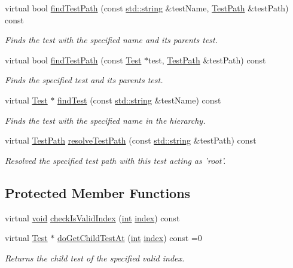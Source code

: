 \begin{DoxyCompactItemize}
virtual bool \hyperlink{class_test_a609b4d93fde2f4fa5b4177c1e1a002ff}{find\-Test\-Path} (const \hyperlink{glew_8h_ae84541b4f3d8e1ea24ec0f466a8c568b}{std\-::string} \&test\-Name, \hyperlink{class_test_path}{Test\-Path} \&test\-Path) const 
\begin{DoxyCompactList}\small\item\em Finds the test with the specified name and its parents test. \end{DoxyCompactList}\item 
virtual bool \hyperlink{class_test_a9f0c1e40c1378f596bd5effd3a034652}{find\-Test\-Path} (const \hyperlink{class_test}{Test} $\ast$test, \hyperlink{class_test_path}{Test\-Path} \&test\-Path) const 
\begin{DoxyCompactList}\small\item\em Finds the specified test and its parents test. \end{DoxyCompactList}\item 
virtual \hyperlink{class_test}{Test} $\ast$ \hyperlink{class_test_a4182e55e98622e6daf5460e5c948dc82}{find\-Test} (const \hyperlink{glew_8h_ae84541b4f3d8e1ea24ec0f466a8c568b}{std\-::string} \&test\-Name) const 
\begin{DoxyCompactList}\small\item\em Finds the test with the specified name in the hierarchy. \end{DoxyCompactList}\item 
virtual \hyperlink{class_test_path}{Test\-Path} \hyperlink{class_test_aaa1f5a8b47a9ad4feed4603c7e56758c}{resolve\-Test\-Path} (const \hyperlink{glew_8h_ae84541b4f3d8e1ea24ec0f466a8c568b}{std\-::string} \&test\-Path) const 
\begin{DoxyCompactList}\small\item\em Resolved the specified test path with this test acting as 'root'. \end{DoxyCompactList}\end{DoxyCompactItemize}
\subsection*{Protected Member Functions}
\begin{DoxyCompactItemize}
\item 
virtual \hyperlink{wglew_8h_aeea6e3dfae3acf232096f57d2d57f084}{void} \hyperlink{class_test_a417a24c245c6273c7886680ab3e30849}{check\-Is\-Valid\-Index} (\hyperlink{wglew_8h_a500a82aecba06f4550f6849b8099ca21}{int} \hyperlink{fmod__codec_8h_a57f14e05b1900f16a2da82ade47d0c6d}{index}) const 
\item 
virtual \hyperlink{class_test}{Test} $\ast$ \hyperlink{class_test_a5c2ca854987799dca293ba78689bf64d}{do\-Get\-Child\-Test\-At} (\hyperlink{wglew_8h_a500a82aecba06f4550f6849b8099ca21}{int} \hyperlink{fmod__codec_8h_a57f14e05b1900f16a2da82ade47d0c6d}{index}) const =0
\begin{DoxyCompactList}\small\item\em Returns the child test of the specified valid index. \end{DoxyCompactList}\end{DoxyCompactItemize}


